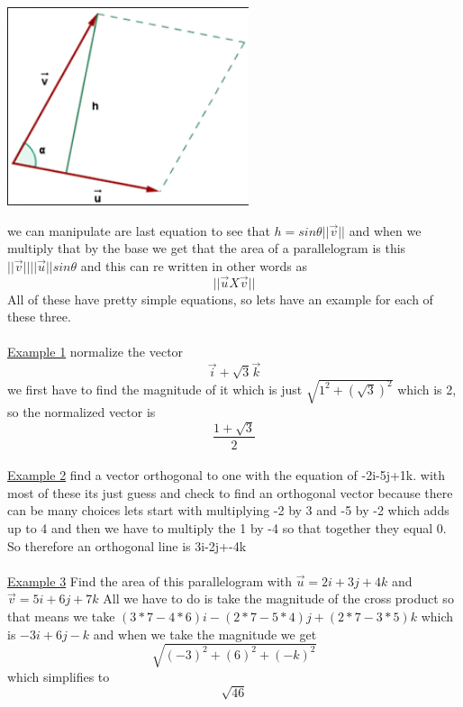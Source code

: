 \documentclass[a4paper,openright, 14pt]{article}
\begin{document}
\begin{center}
\includegraphics[width = 7 cm, height = 5 cm]{vector.png}
\end{center}
we can manipulate are last equation to see that $h=sin\theta||\vec{v}||$ and when we multiply that by the base we get that the area of a parallelogram is this $||\vec{v}||||\vec{u}||sin\theta$
and this can re written in other words as $$||\vec{u}X\vec{v}||$$ 
All of these have pretty simple equations, so lets have an example for each of these three.\\\\
\underline{Example 1} normalize the vector $$\vec{i} + \sqrt{3}\vec{k}$$ 
we first have to find the magnitude of it which is just $\sqrt{1^2+(\sqrt{3})^2}$ which is 2, so the normalized vector is $$\frac{1+\sqrt{3}}{2}$$\\
\underline{Example 2} find a vector orthogonal to one with the equation of -2i-5j+1k. with most of these its just guess and check to find an orthogonal vector because there can be many choices lets start with multiplying -2 by 3 and -5 by -2 which adds up to 4 and then we have to multiply the 1 by -4 so that together they equal 0. So therefore an orthogonal line is 3i-2j+-4k\\\\
\underline{Example 3} Find the area of this parallelogram with $\vec{u}=2i+3j+4k $ and $\vec{v}=5i+6j+7k $
All we have to do is take the magnitude of the cross product so that means we take $(3*7-4*6)i-(2*7-5*4)j+(2*7-3*5)k$ which is $-3i+6j-k$ and when we take the magnitude we get $$\sqrt{(-3)^2+(6)^2+(-k)^2}$$ which simplifies to $$\sqrt{46}$$
\end{document}
